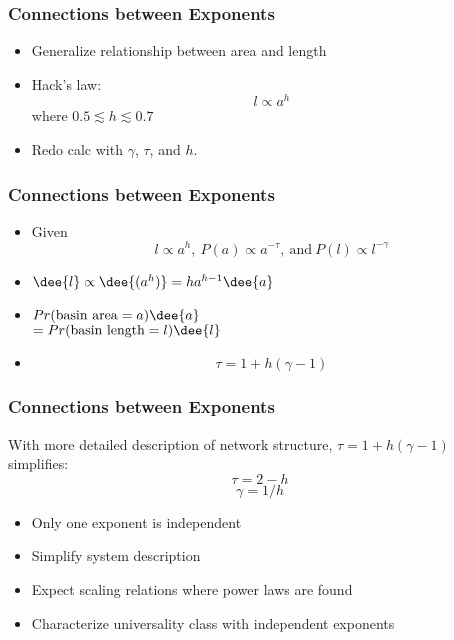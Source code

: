 \begin{frame}
  \frametitle{Connections between Exponents}
  \begin{itemize}
  \item<1-> Generalize relationship between area and length
  \item<2-> Hack's law\cite{hack1957a}:
    $$l \propto a^h$$
    where $0.5 \lesssim h \lesssim 0.7$
  \item<3-> Redo calc with $\gamma$, $\tau$, and $h$.
  \end{itemize}

\end{frame}

\begin{frame}
  \frametitle{Connections between Exponents}

  \begin{itemize}
  \item <1->   
    Given $$ l \propto a^{h}, \ P(a) \propto a^{-\tau},\ \mbox{and} \  P(l) \propto l^{-\gamma}$$
  \item <2->   
    $ \dee{l} \propto \dee{(a^{h})} = h a^{h-1} \dee{a} $    
  \item <3->  
    $
    Pr(\mbox{basin area} = a) \dee{a}
    $\\
    $
    =
    Pr(\mbox{basin length} = l) \dee{l}
    $\\
    \item<7->
      $$\boxed{\tau = 1 + h(\gamma-1)} $$
  \end{itemize}

\end{frame}


\begin{frame}
  \frametitle{Connections between Exponents}

  With more detailed description of network structure,
  $\tau = 1 + h(\gamma-1)$ simplifies:
  $$ \tau = 2 - h$$
  $$ \gamma = 1/h $$

  \begin{itemize}
  \item {} {Only one exponent is independent}
  \item {} {Simplify system description}
  \item {} {Expect scaling relations where power laws are found}
  \item {} {Characterize universality class with independent exponents}
  \end{itemize}

\end{frame}


